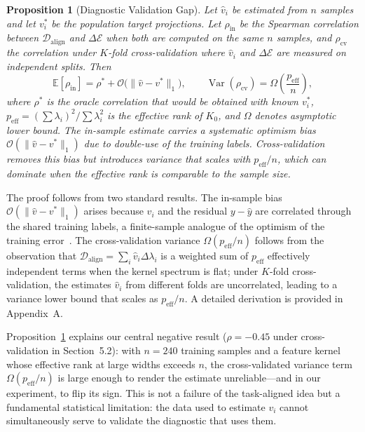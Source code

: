 \documentclass[10pt]{article}
\newtheorem{proposition}[theorem]{Proposition}
\begin{document}
\begin{proposition}[Diagnostic Validation Gap]
\label{prop:gap}
Let $\hat{v}_i$ be estimated from $n$ samples and let $v_i^*$ be the population target projections.  Let $\rho_{\text{in}}$ be the Spearman correlation between $\mathcal{D}_{\text{align}}$ and $\Delta\mathcal{E}$ when both are computed on the same $n$ samples, and $\rho_{\text{cv}}$ the correlation under $K$-fold cross-validation where $\hat{v}_i$ and $\Delta\mathcal{E}$ are measured on independent splits.  Then
\[
\mathbb{E}[\rho_{\text{in}}] = \rho^* + \mathcal{O}\bigl(\|\hat{v} - v^*\|_1\bigr),\qquad
\operatorname{Var}(\rho_{\text{cv}}) = \Omega\!\left(\frac{p_{\text{eff}}}{n}\right),
\]
where $\rho^*$ is the oracle correlation that would be obtained with known $v_i^*$, $p_{\text{eff}} = (\sum \lambda_i)^2 / \sum \lambda_i^2$ is the effective rank of $K_0$, and $\Omega$ denotes asymptotic lower bound.  The in-sample estimate carries a systematic optimism bias $\mathcal{O}(\|\hat{v} - v^*\|_1)$ due to double-use of the training labels.  Cross-validation removes this bias but introduces variance that scales with $p_{\text{eff}} / n$, which can dominate when the effective rank is comparable to the sample size.
\end{proposition}

The proof follows from two standard results. The in-sample bias $\mathcal{O}(\|\hat{v} - v^*\|_1)$ arises because $\hat{v}_i$ and the residual $y - \hat{y}$ are correlated through the shared training labels, a finite-sample analogue of the optimism of the training error~\citep{efron1983estimating}. The cross-validation variance $\Omega(p_{\text{eff}} / n)$ follows from the observation that $\mathcal{D}_{\text{align}} = \sum_i \hat{v}_i \Delta\lambda_i$ is a weighted sum of $p_{\text{eff}}$ effectively independent terms when the kernel spectrum is flat; under $K$-fold cross-validation, the estimates $\hat{v}_i$ from different folds are uncorrelated, leading to a variance lower bound that scales as $p_{\text{eff}} / n$. A detailed derivation is provided in Appendix~A.

Proposition~\ref{prop:gap} explains our central negative result ($\rho = -0.45$ under cross-validation in Section~5.2): with $n=240$ training samples and a feature kernel whose effective rank at large widths exceeds $n$, the cross-validated variance term $\Omega(p_{\text{eff}} / n)$ is large enough to render the estimate unreliable---and in our experiment, to flip its sign.  This is not a failure of the task-aligned idea but a fundamental statistical limitation: the data used to estimate $v_i$ cannot simultaneously serve to validate the diagnostic that uses them.
\end{document}
